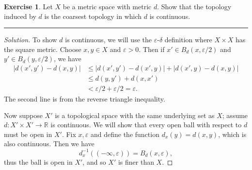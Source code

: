 \documentclass{article}
\theoremstyle{definition}
\newtheorem{exercise}{Exercise}[section]
\begin{document}
\begin{exercise}
  Let $X$ be a metric space with metric $d$.
  Show that the topology induced by $d$ is the coarsest topology in which $d$ is continuous.
\end{exercise}\hrule
\begin{proof}[Solution]
  To show $d$ is continuous, we will use the $\varepsilon$-$\delta$ definition where $X\times X$ has the square metric. Choose $x,y\in X$ and $\varepsilon > 0$. Then if $x'\in B_d(x,\varepsilon/2)$ and $y'\in B_d(y,\varepsilon/2)$, we have
  \begin{align*}
    |d(x',y') - d(x,y)| &\le |d(x',y') - d(x', y)| + |d(x',y)-d(x,y)| \\
    &\le d(y,y') + d(x,x') \\
    &< \varepsilon/2 + \varepsilon/2 = \varepsilon.
  \end{align*}
  The second line is from the reverse triangle inequality.

  Now suppose $X'$ is a topological space with the same underlying set as $X$; assume $d:X'\times X'\to\mathbb{R}$ is continuous. We will show that every open ball with respect to $d$ must be open in $X'$. Fix $x,\varepsilon$ and define the function $d_x(y) = d(x,y)$, which is also continuous. Then we have
  $$d_x^{-1}((-\infty,\varepsilon)) = B_d(x,\varepsilon),$$
  thus the ball is open in $X'$, and so $X'$ is finer than $X$.
\end{proof}

\pagebreak
\end{document}
